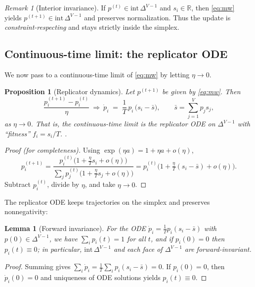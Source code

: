 \documentclass[10pt,a4paper]{amsart}
\numberwithin{equation}{section}
\theoremstyle{plain}
\newtheorem{proposition}[theorem]{Proposition}
\newtheorem{lemma}[theorem]{Lemma}
\theoremstyle{definition}
\theoremstyle{remark}
\newtheorem{remark}[theorem]{Remark}
\newcommand{\R}{\mathbb{R}}
\newcommand{\1}{\mathbbm{1}}
\newcommand{\simplex}{\Delta^{V-1}}
\newcommand{\avgscore}{\bar{s}}
\begin{document}
\begin{remark}[Interior invariance]
If $p^{(t)}\in\mathrm{int}\,\simplex$ and $s_i\in\R$, then \eqref{eq:mw} yields $p^{(t+1)}\in\mathrm{int}\,\simplex$ and preserves normalization. Thus the update is \emph{constraint-respecting} and stays strictly inside the simplex.
\end{remark}

\subsection{Continuous-time limit: the replicator ODE}
We now pass to a continuous-time limit of \eqref{eq:mw} by letting $\eta\to 0$.

\begin{proposition}[Replicator dynamics]\label{prop:replicator}
Let $p^{(t+1)}$ be given by \eqref{eq:mw}. Then
\[
\frac{p^{(t+1)}_i - p^{(t)}_i}{\eta}\ \Longrightarrow\ \dot p_i \;=\; \frac{1}{T}\,p_i\,\big(s_i-\avgscore\big),\qquad
\avgscore=\sum_{j=1}^V p_j s_j,
\]
as $\eta\to 0$. That is, the continuous-time limit is the replicator ODE on $\simplex$ with ``fitness'' $f_i=s_i/T$. \citep[See, e.g.,][]{hofbauer1998evolutionary,shahshahani1979nouvelle,sandholm2010population}.
\end{proposition}

\begin{proof}[Proof (for completeness)]
Using $\exp(\eta a)=1+\eta a+o(\eta)$,
\[
p^{(t+1)}_i=\frac{p^{(t)}_i\big(1+\tfrac{\eta}{T}s_i+o(\eta)\big)}{\sum_j p^{(t)}_j\big(1+\tfrac{\eta}{T}s_j+o(\eta)\big)}
= p^{(t)}_i\Big(1+\tfrac{\eta}{T}(s_i-\avgscore)+o(\eta)\Big).
\]
Subtract $p^{(t)}_i$, divide by $\eta$, and take $\eta\to 0$.
\end{proof}

The replicator ODE keeps trajectories on the simplex and preserves nonnegativity:

\begin{lemma}[Forward invariance]\label{lem:forward-invariance}
For the ODE $\dot p_i=\tfrac{1}{T}p_i(s_i-\avgscore)$ with $p(0)\in\simplex$, we have $\sum_i p_i(t)=1$ for all $t$, and if $p_i(0)=0$ then $p_i(t)\equiv 0$; in particular, $\mathrm{int}\,\simplex$ and each face of $\simplex$ are forward-invariant.
\end{lemma}

\begin{proof}
Summing gives $\sum_i \dot p_i = \tfrac{1}{T}\sum_i p_i(s_i-\avgscore)=0$. If $p_i(0)=0$, then $\dot p_i(0)=0$ and uniqueness of ODE solutions yields $p_i(t)\equiv 0$.
\end{proof}
\end{document}
